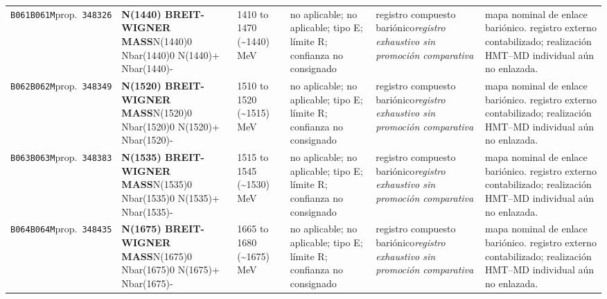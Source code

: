 \begin{landscape}
\begin{longtable}{L{1.85cm}L{4.45cm}L{2.35cm}L{4.05cm}L{3.35cm}L{7.15cm}}
\texttt{B061}\newline \texttt{B061M}\newline prop.\ \texttt{348326} & \textbf{N(1440) BREIT-WIGNER MASS}\newline N(1440)0 \textbar{}\allowbreak{} Nbar(1440)0 \textbar{}\allowbreak{} N(1440)+ \textbar{}\allowbreak{} Nbar(1440)- & 1410 to 1470 (\textasciitilde{}1440)\,MeV & no aplicable; no aplicable; tipo E; límite R; confianza no consignado & registro compuesto bariónico\newline \emph{registro exhaustivo sin promoción comparativa} & mapa nominal de enlace bariónico. registro externo contabilizado; realización HMT--MD individual aún no enlazada. \\
\texttt{B062}\newline \texttt{B062M}\newline prop.\ \texttt{348349} & \textbf{N(1520) BREIT-WIGNER MASS}\newline N(1520)0 \textbar{}\allowbreak{} Nbar(1520)0 \textbar{}\allowbreak{} N(1520)+ \textbar{}\allowbreak{} Nbar(1520)- & 1510 to 1520 (\textasciitilde{}1515)\,MeV & no aplicable; no aplicable; tipo E; límite R; confianza no consignado & registro compuesto bariónico\newline \emph{registro exhaustivo sin promoción comparativa} & mapa nominal de enlace bariónico. registro externo contabilizado; realización HMT--MD individual aún no enlazada. \\
\texttt{B063}\newline \texttt{B063M}\newline prop.\ \texttt{348383} & \textbf{N(1535) BREIT-WIGNER MASS}\newline N(1535)0 \textbar{}\allowbreak{} Nbar(1535)0 \textbar{}\allowbreak{} N(1535)+ \textbar{}\allowbreak{} Nbar(1535)- & 1515 to 1545 (\textasciitilde{}1530)\,MeV & no aplicable; no aplicable; tipo E; límite R; confianza no consignado & registro compuesto bariónico\newline \emph{registro exhaustivo sin promoción comparativa} & mapa nominal de enlace bariónico. registro externo contabilizado; realización HMT--MD individual aún no enlazada. \\
\texttt{B064}\newline \texttt{B064M}\newline prop.\ \texttt{348435} & \textbf{N(1675) BREIT-WIGNER MASS}\newline N(1675)0 \textbar{}\allowbreak{} Nbar(1675)0 \textbar{}\allowbreak{} N(1675)+ \textbar{}\allowbreak{} Nbar(1675)- & 1665 to 1680 (\textasciitilde{}1675)\,MeV & no aplicable; no aplicable; tipo E; límite R; confianza no consignado & registro compuesto bariónico\newline \emph{registro exhaustivo sin promoción comparativa} & mapa nominal de enlace bariónico. registro externo contabilizado; realización HMT--MD individual aún no enlazada. \\

\end{longtable}
\end{landscape}
